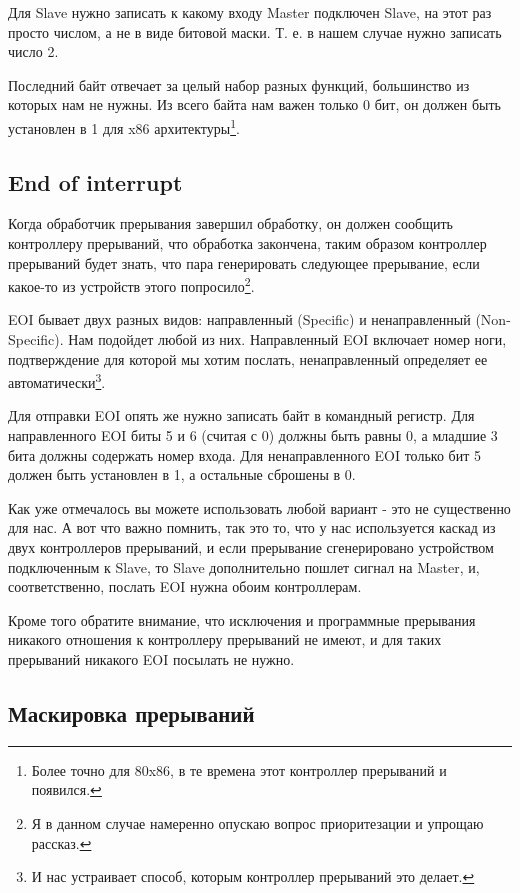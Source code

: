 Для Slave нужно записать к какому входу Master подключен Slave, на этот раз
просто числом, а не в виде битовой маски. Т. е. в нашем случае нужно записать
число 2.

Последний байт отвечает за целый набор разных функций, большинство из которых
нам не нужны. Из всего байта нам важен только 0 бит, он должен быть установлен
в 1 для x86 архитектуры\footnote{Более точно для 80x86, в те времена этот
контроллер прерываний и появился.}.

\subsection{End of interrupt}

Когда обработчик прерывания завершил обработку, он должен сообщить контроллеру
прерываний, что обработка закончена, таким образом контроллер прерываний будет
знать, что пара генерировать следующее прерывание, если какое-то из устройств
этого попросило\footnote{Я в данном случае намеренно опускаю вопрос
приоритезации и упрощаю рассказ.}.

EOI бывает двух разных видов: направленный (Specific) и ненаправленный
(Non-Specific). Нам подойдет любой из них. Направленный EOI включает номер ноги,
подтверждение для которой мы хотим послать, ненаправленный определяет ее
автоматически\footnote{И нас устраивает способ, которым контроллер прерываний
это делает.}.

Для отправки EOI опять же нужно записать байт в командный регистр. Для
направленного EOI биты 5 и 6 (считая с 0) должны быть равны 0, а младшие 3 бита
должны содержать номер входа. Для ненаправленного EOI только бит 5 должен быть
установлен в 1, а остальные сброшены в 0.

Как уже отмечалось вы можете использовать любой вариант - это не существенно для
нас. А вот что важно помнить, так это то, что у нас используется каскад из двух
контроллеров прерываний, и если прерывание сгенерировано устройством
подключенным к Slave, то Slave дополнительно пошлет сигнал на Master, и,
соответственно, послать EOI нужна обоим контроллерам.

Кроме того обратите внимание, что исключения и программные прерывания никакого
отношения к контроллеру прерываний не имеют, и для таких прерываний никакого
EOI посылать не нужно.

\subsection{Маскировка прерываний}

